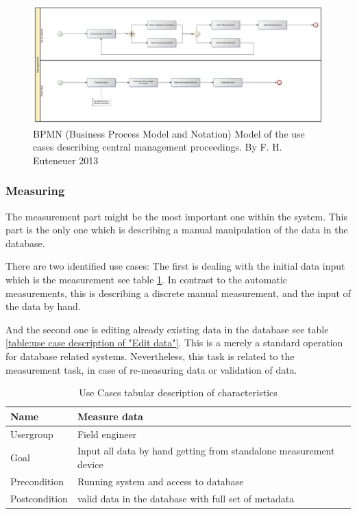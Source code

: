 \begin{figure}[H]
	\centering
 	 \includegraphics[scale=0.24]{graphics/bpmn_use-cases_management.jpg} 
	\caption{BPMN (Business Process Model and Notation) Model of the use cases describing central management proceedings. By F. H. Euteneuer 2013}
	 \label{fig:bpmn_use-case_management}
\end{figure}


\subsubsection{Measuring}

The measurement part might be the most important one within the system. This part is the only one which is describing a manual manipulation of the data in the database.

There are two identified use cases: The first is dealing with the initial data input which is the measurement see table \ref{table:use case description of "Measure data"}. In contrast to the automatic measurements, this is describing a discrete manual measurement, and the input of the data by hand.

And the second one is editing already existing data in the database see table \ref{table:use case description of "Edit data"}. This is a merely a standard operation for database related systems. Nevertheless, this task is related to the measurement task, in case of re-measuring data or validation of data.

\begin{table}[H]
\centering
\begin{tabular}{l | p{11cm}}
Name & Measure data\\ \hline 
Usergroup & Field engineer\\ \hline 
Goal & Input all data by hand  getting from standalone measurement device\\ \hline 
Precondition & Running system and access to database\\ \hline 
Postcondition & valid data in the database with full set of metadata\\ 
\end{tabular}
\caption{Use Cases tabular description of characteristics} 
\label{table:use case description of "Measure data"}
\end{table}

